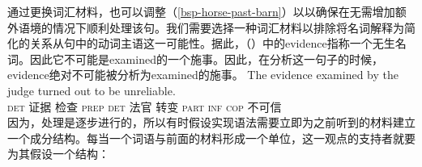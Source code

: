 \noindent
通过更换词汇材料，也可以调整（\ref{bsp-horse-past-barn}）以以确保在无需增加额外语境的情况下顺利处理该句。我们需要选择一种词汇材料以排除将名词解释为简化的关系从句中的动词主语这一可能性。据此，（）中的evidence指称一个无生名词。因此它不可能是examined的一个施事。因此，在分析这一句子的时候，evidence绝对不可能被分析为examined的施事\citep{SW2011a}。
\ea
\gll The evidence examined by the judge turned out to be unreliable.\\
    \textsc{det} 证据 检查 \textsc{prep} \textsc{det} 法官 转变 \textsc{part} \textsc{inf} \textsc{cop}  不可信\\
\z
因为，处理是逐步进行的，所以有时假设实现语法需要立即为之前听到的材料建立一个成分结构\citep{AS82a,Hausser92a-u}。每当一个词语与前面的材料形成一个单位，这一观点的支持者就要为其假设一个结构：

